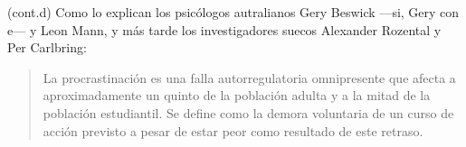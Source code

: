 \documentclass{screenplay}[2018/01/07]
\begin{document}

    \begin{dialogue}{(cont.d)}
        Como lo explican los psicólogos autralianos Gery Beswick —si, Gery con
        e— y Leon Mann, y más tarde los investigadores suecos Alexander Rozental
        y Per Carlbring:
        \begin{quote}
            La procrastinación es una falla autorregulatoria omnipresente que
            afecta a aproximadamente un quinto de la población adulta y a la
            mitad de la población estudiantil. Se define como la demora
            voluntaria de un curso de acción previsto a pesar de estar peor
            como resultado de este retraso.
        \end{quote}\citet{rozental2014}
    \end{dialogue}
    \fadeout

    \theend

    \pagebreak
    
    
\end{document}

